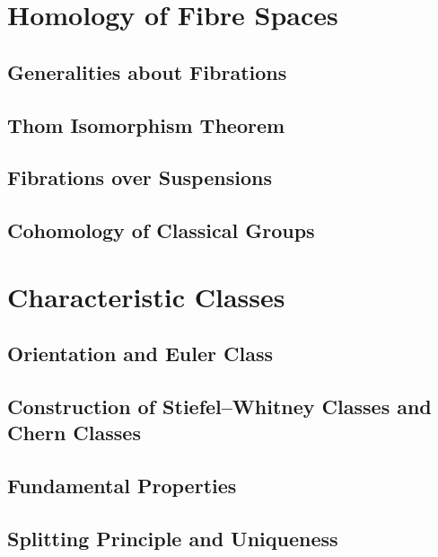 \documentclass[11pt, a4paper]{article}
\begin{document}
\section{Homology of Fibre Spaces}

\subsection{Generalities about Fibrations}

\subsection{Thom Isomorphism Theorem}

\subsection{Fibrations over Suspensions}

\subsection{Cohomology of Classical Groups}

\section{Characteristic Classes}

\subsection{Orientation and Euler Class}

\subsection{Construction of Stiefel--Whitney Classes and Chern Classes}

\subsection{Fundamental Properties}

\subsection{Splitting Principle and Uniqueness}
\end{document}
